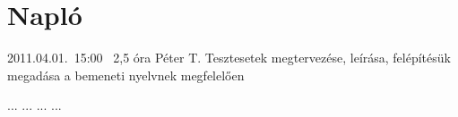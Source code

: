 %
\section{Napló}

\begin{naplo}

\bejegyzes
{2011.04.01.~15:00~} %
{2,5 óra} %
{Péter T.\newline
}%
{Tesztesetek megtervezése, leírása, felépítésük megadása a bemeneti nyelvnek megfelelően} %


\bejegyzes
{...}
{...}
{...}
{...}


\end{naplo}

